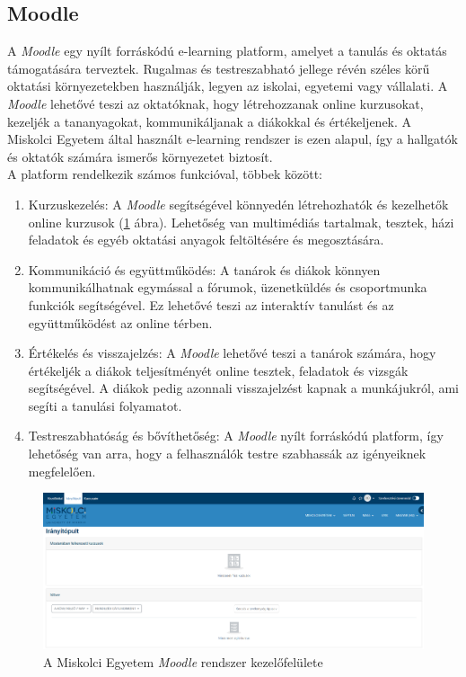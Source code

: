 \subsection{Moodle}

A \textit{Moodle} \cite{moodle} egy nyílt forráskódú e-learning platform, amelyet a tanulás és oktatás támogatására terveztek. Rugalmas és testreszabható jellege révén széles körű oktatási környezetekben használják, legyen az iskolai, egyetemi vagy vállalati. A \textit{Moodle} lehetővé teszi az oktatóknak, hogy létrehozzanak online kurzusokat, kezeljék a tananyagokat, kommunikáljanak a diákokkal és értékeljenek. A Miskolci Egyetem által használt e-learning rendszer is ezen alapul, így a hallgatók és oktatók számára ismerős környezetet biztosít.
\\
A platform rendelkezik számos funkcióval, többek között:

\begin{enumerate}


\item Kurzuskezelés: A \textit{Moodle} segítségével könnyedén létrehozhatók és kezelhetők online kurzusok (\ref{fig:moodle} ábra). Lehetőség van multimédiás tartalmak, tesztek, házi feladatok és egyéb oktatási anyagok feltöltésére és megosztására.

\item Kommunikáció és együttműködés: A tanárok és diákok könnyen kommunikálhatnak egymással a fórumok, üzenetküldés és csoportmunka funkciók segítségével. Ez lehetővé teszi az interaktív tanulást és az együttműködést az online térben.

\item Értékelés és visszajelzés: A \textit{Moodle} lehetővé teszi a tanárok számára, hogy értékeljék a diákok teljesítményét online tesztek, feladatok és vizsgák segítségével. A diákok pedig azonnali visszajelzést kapnak a munkájukról, ami segíti a tanulási folyamatot.

\item Testreszabhatóság és bővíthetőség: A \textit{Moodle} nyílt forráskódú platform, így lehetőség van arra, hogy a felhasználók testre szabhassák az igényeiknek megfelelően.

\end{enumerate}


\begin{figure}[h]
\centering
\includegraphics[width=\textwidth]{images/moodle.png}
\caption{A Miskolci Egyetem \textit{Moodle} rendszer kezelőfelülete \cite{moodle miskolci}}
\label{fig:moodle}
\end{figure}


